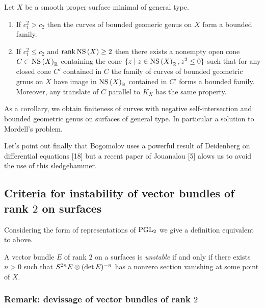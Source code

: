\documentclass[12pt]{article}
\begin{document}
\begin{theorem}
Let $X$ be a smooth proper surface minimal of general type.
\begin{enumerate}
\item If $c_1^2 > c_2$ then the curves of bounded geomeric genus on $X$ form a bounded family.
\item If $c_1^2 \le c_2$ and $\operatorname{\mathrm{rank}} \mathrm{NS}\left( X \right) \ge 2$ then there exists a nonempty open cone $C \subset \mathrm{NS}\left( X \right)_{\mathbb{R}}$ containing the cone $\{ z \mid z \in \mathrm{NS}\left( X \right)_{\mathbb{R}} , z^2 \le 0 \}$ such that for any closed cone $C'$ contained in $C$ the family of curves of bounded geometric grnus on $X$ have image in $\mathrm{NS}\left( X \right)_{\mathbb{R}}$ contained in $C'$ forms a bounded family. Moreover, any translate of $C$ parallel to $K_X$ has the same property. 
\end{enumerate} 
\end{theorem}

As a corollary, we obtain finiteness of curves with negative self-intersection and bounded geometric genus on surfaces of general type. In particular a solution to Mordell's problem.
\par 
Let's point out finally that Bogomolov uses a powerful result of Deidenberg on differential equations [18] but a recent paper of Jouanalou [5] alows us to avoid the use of this sledgehammer.

\subsection{Criteria for instability of vector bundles of rank $2$ on surfaces}

Considering the form of representations of $\mathrm{PGL}_2$ we give a definition equivalent to above.

\begin{defn}
A vector bundle $E$ of rank $2$ on a surfaces is \textit{unstable} if and only if there exists $n > 0$ such that $S^{2n} E \otimes (\det{E})^{-n}$ has a nonzero section vanishing at some point of $X$.
\end{defn}

\subsubsection{Remark: devissage of vector bundles of rank $2$}
\end{document}
